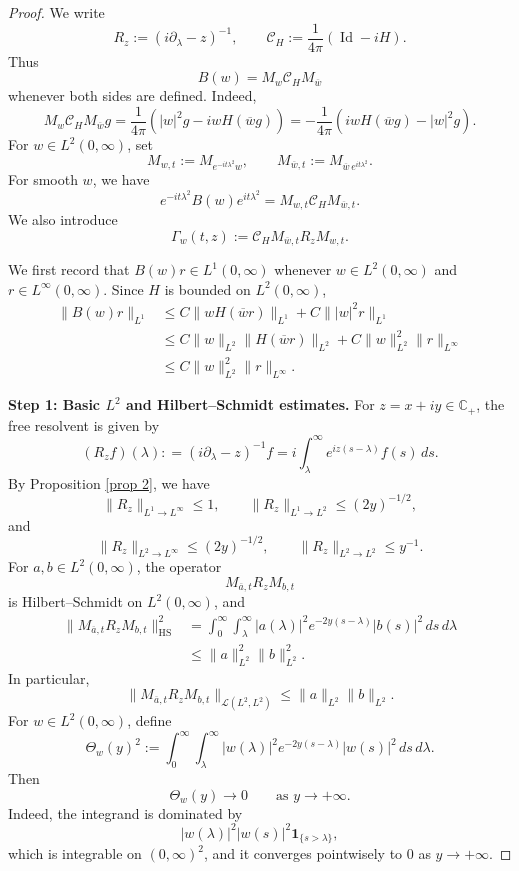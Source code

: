 \documentclass[10pt,a4paper]{amsart}
\begin{document}
\begin{proof}
We write
\[
R_z:=(i\partial_\lambda-z)^{-1},
\qquad
\mathcal C_H:=\frac1{4\pi}(\operatorname{Id}-iH).
\]
Thus
\[
B(w)=M_w\mathcal C_HM_{\overline w}
\]
whenever both sides are defined. Indeed,
\[
M_w\mathcal C_HM_{\overline w}g
=
\frac1{4\pi}
\left(
|w|^2g-iwH(\overline wg)
\right)
=
-\frac1{4\pi}
\left(
iwH(\overline wg)-|w|^2g
\right).
\]
For \(w\in L^2(0,\infty)\), set
\[
M_{w,t}:=M_{e^{-it\lambda^2}w},
\qquad
M_{\overline w,t}:=M_{\overline w\,e^{it\lambda^2}}.
\]
For smooth \(w\), we have
\[
e^{-it\lambda^2}B(w)e^{it\lambda^2}
=
M_{w,t}\mathcal C_HM_{\overline w,t}.
\]
We also introduce
\begin{equation}
\label{A7-Gamma-def}
\Gamma_w(t,z)
:=
\mathcal C_HM_{\overline w,t}R_zM_{w,t}.
\end{equation}

We first record that \(B(w)r\in L^1(0,\infty)\) whenever
\(w\in L^2(0,\infty)\) and \(r\in L^\infty(0,\infty)\). Since \(H\) is bounded
on \(L^2(0,\infty)\),
\[
\begin{aligned}
\|B(w)r\|_{L^1}
&\le
C\|wH(\overline wr)\|_{L^1}
+
C\||w|^2r\|_{L^1}       \\
&\le
C\|w\|_{L^2}\|H(\overline wr)\|_{L^2}
+
C\|w\|_{L^2}^2\|r\|_{L^\infty}  \\
&\le
C\|w\|_{L^2}^2\|r\|_{L^\infty}.
\end{aligned}
\]

\medskip
\noindent
\textbf{Step 1: Basic \(L^2\) and Hilbert--Schmidt estimates.}
For \(z=x+iy\in\mathbb C_+\), the free resolvent is given by
\[
(R_z f)(\lambda) : = (i\partial_\lambda-z)^{-1} f
=
i\int_\lambda^\infty e^{iz(s-\lambda)}f(s)\,ds .
\]
By Proposition \ref{prop 2}, we have
\begin{equation}
\label{A7-Rz-basic-bounds}
\|R_z\|_{L^1\to L^\infty}\le1,
\qquad
\|R_z\|_{L^1\to L^2}\le (2y)^{-1/2},
\end{equation}
and
\begin{equation}
\label{A7-Rz-L2-bounds}
\|R_z\|_{L^2\to L^\infty}\le (2y)^{-1/2},
\qquad
\|R_z\|_{L^2\to L^2}\le y^{-1}.
\end{equation}
For \(a,b\in L^2(0,\infty)\), the operator
\[
M_{\overline a,t}R_zM_{b,t}
\]
is Hilbert--Schmidt on \(L^2(0,\infty)\), and
\begin{equation}
\label{A7-HS-mixed}
\begin{aligned}
\|M_{\overline a,t}R_zM_{b,t}\|_{\mathrm{HS}}^2
&=
\int_0^\infty\int_\lambda^\infty
|a(\lambda)|^2 e^{-2y(s-\lambda)}|b(s)|^2\,ds\,d\lambda  \\
&\le
\|a\|_{L^2}^2\|b\|_{L^2}^2 .
\end{aligned}
\end{equation}
In particular,
\[
\|M_{\overline a,t}R_zM_{b,t}\|_{\mathcal L(L^2,L^2)}
\le
\|a\|_{L^2}\|b\|_{L^2}.
\]
For \(w\in L^2(0,\infty)\), define
\[
\Theta_w(y)^2
:=
\int_0^\infty\int_\lambda^\infty
|w(\lambda)|^2 e^{-2y(s-\lambda)}|w(s)|^2\,ds\,d\lambda .
\]
Then
\[
\Theta_w(y)\to0
\qquad\text{as }y\to+\infty.
\]
Indeed, the integrand is dominated by
\[
|w(\lambda)|^2|w(s)|^2\mathbf 1_{\{s>\lambda\}},
\]
which is integrable on \((0,\infty)^2\), and it converges pointwisely to \(0\) as
\(y\to+\infty\).


\end{proof}
\end{document}
